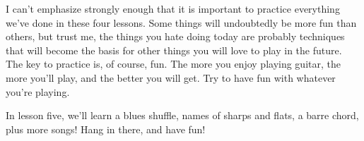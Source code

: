 I can't emphasize strongly enough that it is important to practice everything
we've done in these four lessons. Some things will undoubtedly be more fun than
others, but trust me, the things you hate doing today are probably techniques
that will become the basis for other things you will love to play in the
future. The key to practice is, of course, fun. The more you enjoy playing
guitar, the more you'll play, and the better you will get. Try to have fun with
whatever you're playing.

In lesson five, we'll learn a blues shuffle, names of sharps and flats, a barre
chord, plus more songs! Hang in there, and have fun!

